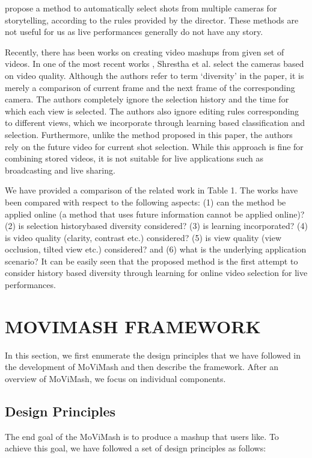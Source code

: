 \documentclass{sig-alternate}
\begin{document}
propose a method to automatically select shots from multiple cameras
for storytelling, according to the rules provided by the director.
These methods are not useful for us as live performances generally
do not have any story.

Recently, there has been works on creating video mashups from
given set of videos. In one of the most recent works \cite{saini2012movimash}, Shrestha
et al. select the cameras based on video quality. Although the authors
refer to term ‘diversity’ in the paper, it is merely a comparison
of current frame and the next frame of the corresponding camera.
The authors completely ignore the selection history and the
time for which each view is selected. The authors also ignore editing
rules corresponding to different views, which we incorporate
through learning based classification and selection. Furthermore,
unlike the method proposed in this paper, the authors rely on the
future video for current shot selection. While this approach is fine
for combining stored videos, it is not suitable for live applications
such as broadcasting and live sharing.

We have provided a comparison of the related work in Table 1.
The works have been compared with respect to the following aspects:
(1) can the method be applied online (a method that uses future
information cannot be applied online)? (2) is selection historybased
diversity considered? (3) is learning incorporated? (4) is
video quality (clarity, contrast etc.) considered? (5) is view quality
(view occlusion, tilted view etc.) considered? and (6) what is the
underlying application scenario? It can be easily seen that the proposed
method is the first attempt to consider history based diversity
through learning for online video selection for live performances.

\section{MOVIMASH FRAMEWORK}
In this section, we ﬁrst enumerate the design principles that we have followed in the development of MoViMash and then describe the framework. After an overview of MoViMash, we focus on individual components.

\subsection{Design Principles}
The end goal of the MoViMash is to produce a mashup that users like. To achieve this goal, we have followed a set of design principles as follows:
\end{document}
